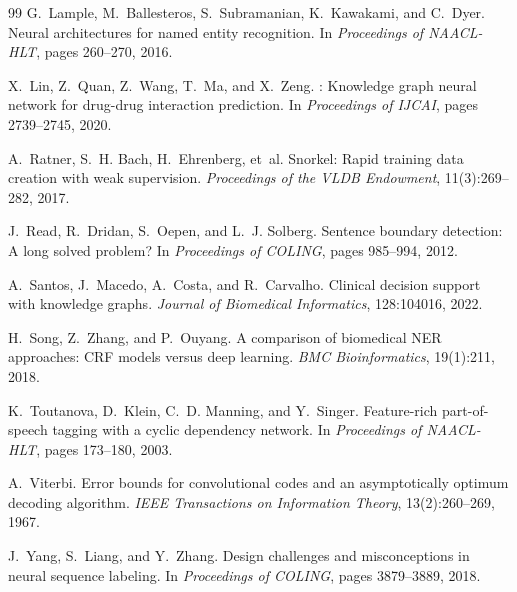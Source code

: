\documentclass[12pt, a4paper, twoside]{report}
\begin{document}
\begin{thebibliography}{99}
G.~Lample, M.~Ballesteros, S.~Subramanian, K.~Kawakami, and C.~Dyer.
\newblock Neural architectures for named entity recognition.
\newblock In \emph{Proceedings of NAACL-HLT}, pages 260--270, 2016.

X.~Lin, Z.~Quan, Z.~Wang, T.~Ma, and X.~Zeng.
: Knowledge graph neural network for drug-drug interaction prediction.
\newblock In \emph{Proceedings of IJCAI}, pages 2739--2745, 2020.

A.~Ratner, S.~H. Bach, H.~Ehrenberg, et~al.
\newblock Snorkel: Rapid training data creation with weak supervision.
\newblock \emph{Proceedings of the VLDB Endowment}, 11(3):269--282, 2017.

J.~Read, R.~Dridan, S.~Oepen, and L.~J. Solberg.
\newblock Sentence boundary detection: A long solved problem?
\newblock In \emph{Proceedings of COLING}, pages 985--994, 2012.

A.~Santos, J.~Macedo, A.~Costa, and R.~Carvalho.
\newblock Clinical decision support with knowledge graphs.
\newblock \emph{Journal of Biomedical Informatics}, 128:104016, 2022.

H.~Song, Z.~Zhang, and P.~Ouyang.
\newblock A comparison of biomedical {NER} approaches: {CRF} models versus deep learning.
\newblock \emph{BMC Bioinformatics}, 19(1):211, 2018.

K.~Toutanova, D.~Klein, C.~D. Manning, and Y.~Singer.
\newblock Feature-rich part-of-speech tagging with a cyclic dependency network.
\newblock In \emph{Proceedings of NAACL-HLT}, pages 173--180, 2003.

A.~Viterbi.
\newblock Error bounds for convolutional codes and an asymptotically optimum decoding algorithm.
\newblock \emph{IEEE Transactions on Information Theory}, 13(2):260--269, 1967.

J.~Yang, S.~Liang, and Y.~Zhang.
\newblock Design challenges and misconceptions in neural sequence labeling.
\newblock In \emph{Proceedings of COLING}, pages 3879--3889, 2018.

\end{thebibliography}
\end{document}
